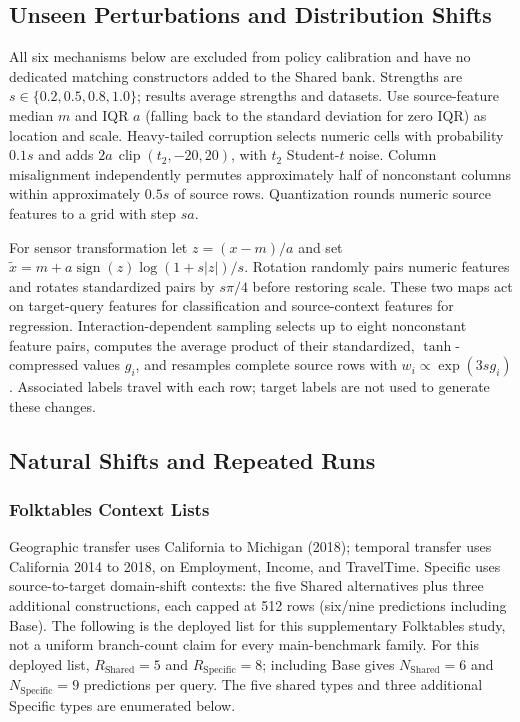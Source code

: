 \subsection{Unseen Perturbations and Distribution Shifts}
\label{app:revision-unseen}
All six mechanisms below are excluded from policy calibration and have no
dedicated matching constructors added to the Shared bank. Strengths are
$s\in\{0.2,0.5,0.8,1.0\}$; results average strengths and datasets.
Use source-feature median $m$ and IQR $a$ (falling back to the standard
deviation for zero IQR) as location and scale. Heavy-tailed corruption selects
numeric cells with probability $0.1s$ and adds
$2a\,\operatorname{clip}(t_2,-20,20)$, with $t_2$ Student-$t$ noise.
Column misalignment independently permutes approximately half of nonconstant
columns within approximately $0.5s$ of source rows. Quantization rounds numeric
source features to a grid with step $sa$.

For sensor transformation let $z=(x-m)/a$ and set
$\widetilde x=m+a\operatorname{sign}(z)\log(1+s|z|)/s$.
Rotation randomly pairs numeric features and rotates standardized pairs by
$s\pi/4$ before restoring scale. These two maps act on target-query features for
classification and source-context features for regression. Interaction-dependent
sampling selects up to eight nonconstant feature pairs, computes the average
product of their standardized, $\tanh$-compressed values $g_i$, and resamples
complete source rows with $w_i\propto\exp(3s g_i)$. Associated labels travel
with each row; target labels are not used to generate these changes.






\subsection{Natural Shifts and Repeated Runs}
\label{app:revision-natural}
\subsubsection{Folktables Context Lists}
\label{app:revision-folktables-contexts}
Geographic transfer uses California to Michigan (2018); temporal transfer uses
California 2014 to 2018, on Employment, Income, and TravelTime. Specific uses
source-to-target domain-shift contexts: the five Shared alternatives plus three
additional constructions, each capped at 512 rows (six/nine predictions including
Base). The following is the deployed list for this supplementary Folktables study,
not a uniform branch-count claim for every main-benchmark family.
For this deployed list, $R_{\mathrm{Shared}}=5$ and
$R_{\mathrm{Specific}}=8$; including Base gives
$N_{\mathrm{Shared}}=6$ and $N_{\mathrm{Specific}}=9$ predictions per query.
The five shared types and three additional Specific types are enumerated below.

